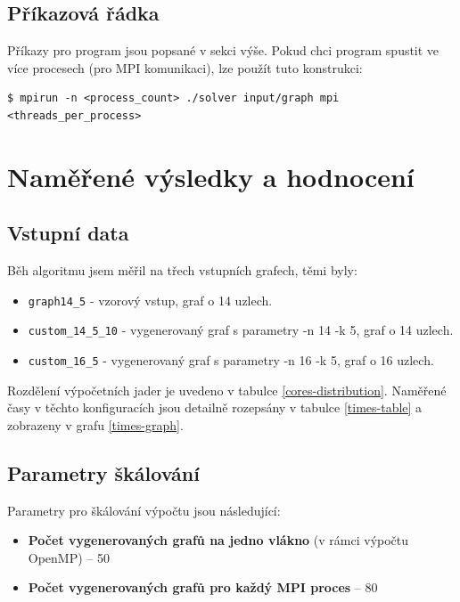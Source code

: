 \documentclass[czech]{article}
\newcommand{\graphsperthread}{50}
\newcommand{\graphspermpiproc}{80}
\begin{document}
\subsection{Příkazová řádka}
Příkazy pro program jsou popsané v sekci výše. Pokud chci program spustit ve více procesech (pro MPI komunikaci), lze použít tuto konstrukci:
\begin{lstlisting}[tabsize=2]
	$ mpirun -n <process_count> ./solver input/graph mpi <threads_per_process>
\end{lstlisting}

\section{Naměřené výsledky a hodnocení}
\subsection{Vstupní data}
Běh algoritmu jsem měřil na třech vstupních grafech, těmi byly:
\begin{itemize}
	\item \texttt{graph14\_5} - vzorový vstup, graf o 14 uzlech.
	\item \texttt{custom\_14\_5\_10} - vygenerovaný graf s parametry -n 14 -k 5, graf o 14 uzlech.
	\item \texttt{custom\_16\_5} - vygenerovaný graf s parametry -n 16 -k 5, graf o 16 uzlech.
\end{itemize}

Rozdělení výpočetních jader je uvedeno v tabulce \ref{cores-distribution}. Naměřené časy v těchto konfiguracích jsou detailně rozepsány v tabulce \ref{times-table} a zobrazeny v grafu \ref{times-graph}. 

\subsection{Parametry škálování}
Parametry pro škálování výpočtu jsou následující:
\begin{itemize}
	\item \textbf{Počet vygenerovaných grafů na jedno vlákno} (v rámci výpočtu OpenMP) -- \graphsperthread
	\item \textbf{Počet vygenerovaných grafů pro každý MPI proces} -- \graphspermpiproc
\end{itemize}
\end{document}
